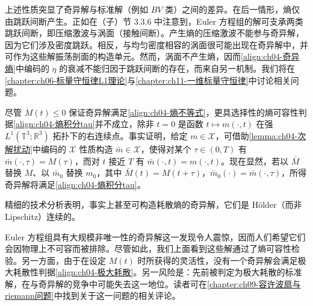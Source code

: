﻿\documentclass[../../main.tex]{subfiles}
\begin{document}
上述性质突显了奇异解与标准解（例如 $BV$ 类）之间的差异。在后一情形，熵仅由跳跃间断产生。正如在（子）节 3.3.6 中注意到，Euler 方程组的解可支承两类跳跃间断，即压缩激波与涡面（接触间断）。产生熵的压缩激波不能参与奇异解，因为它们涉及密度跳跃。相反，与均匀密度相容的涡面很可能出现在奇异解中，并可作为这些解振荡剖面的构造单元。然而，涡面不产生熵，因而\eqref{align:ch04-奇异熵}中编码的 $\eta$ 的衰减不能归因于跳跃间断的存在，而来自另一机制。我们将在\cref{chapter:ch06-标量守恒律L1理论}与\cref{chapter:ch11-一维标量守恒律}中讨论相关问题。


尽管 $\dot{M}(t)\leqslant 0$ 保证奇异解满足\eqref{align:ch04-熵不等式}，更具选择性的熵可容性判据\eqref{align:ch04-熵积分tau}并不成立，除非 $t=0$ 是函数 $t\mapsto m(\cdot,t)$ 在强 $L^{1}(\mathbb{T}^{3};\mathbb{R}^{3})$ 拓扑下的右连续点。事实证明，给定 $m\in\mathscr{X}$，可借助\cref{lemma:ch04-次解扰动}中编码的 $\mathscr{X}$ 性质构造 $\bar{m}\in\mathscr{X}$，使得对某个 $\tau\in(0,T)$ 有 $\bar{m}(\cdot,\tau)=M(\tau)$，而对 $t$ 接近 $T$ 有 $\bar{m}(\cdot,t)=m(\cdot,t)$。现在显然，若以 $\bar{M}$ 替换 $M$、以 $\bar{m}_{0}$ 替换 $m_{0}$，其中 $\bar{M}(t)=M(t+\tau)$，$\bar{m}_{0}(\cdot)=\bar{m}(\cdot,\tau)$，所得奇异解将满足\eqref{align:ch04-熵积分tau}。

精细的技术分析表明，事实上甚至可构造耗散熵的奇异解，它们是 Hölder（而非 Lipschitz）连续的。

Euler 方程组具有大规模非唯一性的奇异解这一发现令人震惊，因而人们希望它们会因物理上不可容而被排除。尽管如此，我们上面看到这些解通过了熵可容性检验。另一方面，由于在设定 $M(t)$ 时所获得的灵活性，没有一个奇异解会满足极大耗散性判据\eqref{align:ch04-极大耗散}。另一风险是：先前被判定为极大耗散的标准解，在与奇异解的竞争中可能失去这一地位。读者可在\cref{chapter:ch09-容许波扇与riemann问题}中找到关于这一问题的相关评论。
\end{document}
